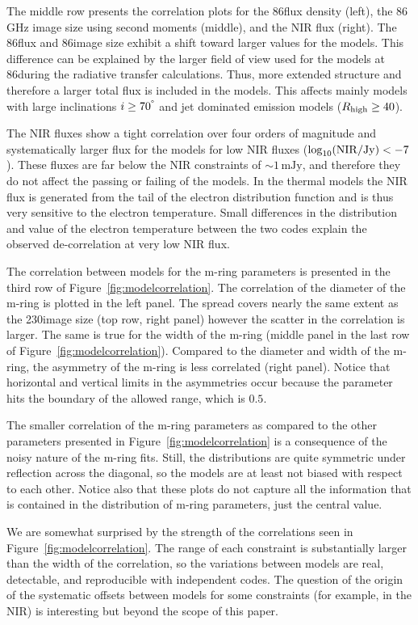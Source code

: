 The middle row presents the correlation plots for the 86\GHz flux density (left), the 86\,GHz image size using second moments (middle), and the NIR flux (right).
The 86\GHz flux and 86\GHz image size exhibit a shift toward larger values for the \bhac models.
This difference can be explained by the larger field of view used for the \bhac models at 86\GHz during the radiative transfer calculations.
Thus, more extended structure and therefore a larger total flux is included in the \bhac models.
This affects mainly models with large inclinations $i\geq70^\degree$ and jet dominated emission models ($R_\mathrm{high} \geq 40$).

The NIR fluxes show a tight correlation over four orders of magnitude and systematically larger flux for the \bhac models for low NIR fluxes ($\log_{10}({\rm NIR}/{\rm Jy}) < -7$).
These fluxes are far below the NIR constraints of $\sim 1\,\mathrm{mJy}$, and therefore they do not affect the passing or failing of the models.
In the thermal models the NIR flux is generated from the tail of the electron distribution function and is thus very sensitive to the electron temperature.
Small differences in the distribution and value of the electron temperature between the two codes explain the observed de-correlation at very low NIR flux.

The correlation between models for the m-ring parameters is presented in the third row of Figure~\ref{fig:modelcorrelation}.
The correlation of the diameter of the m-ring is plotted in the left panel.
The spread covers nearly the same extent as the 230\GHz image size (top row, right panel) however the scatter in the correlation is larger.
The same is true for the width of the m-ring (middle panel in the last row of Figure~\ref{fig:modelcorrelation}).
Compared to the diameter and width of the m-ring, the asymmetry of the m-ring is less correlated (right panel).
Notice that horizontal and vertical limits in the asymmetries occur because the parameter hits the boundary of the allowed range, which is $0.5$.

The smaller correlation of the m-ring parameters as compared to the other parameters presented in Figure~\ref{fig:modelcorrelation} is a consequence of the noisy nature of the m-ring fits.
Still, the distributions are quite symmetric under reflection across the diagonal, so the models are at least not biased with respect to each other.
Notice also that these plots do not capture all the information that is contained in the distribution of m-ring parameters, just the central value.

We are somewhat surprised by the strength of the correlations seen in Figure~\ref{fig:modelcorrelation}.
The range of each constraint is substantially larger than the width of the correlation, so the variations between models are real, detectable, and reproducible with independent codes.
The question of the origin of the systematic offsets between models for some constraints (for example, in the NIR) is interesting but beyond the scope of this paper.
